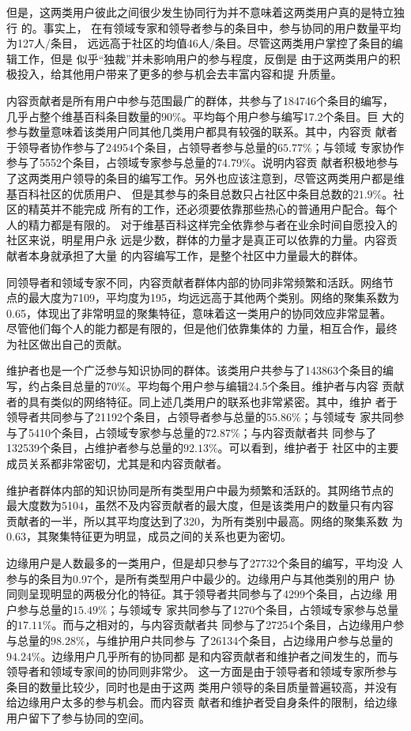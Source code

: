 但是，这两类用户彼此之间很少发生协同行为并不意味着这两类用户真的是特立独行
的。事实上，
在有领域专家和领导者参与的条目中，参与协同的用户数量平均为127人/条目，
远远高于社区的均值46人/条目。尽管这两类用户掌控了条目的编辑工作，但是
似乎“独裁”并未影响用户的参与程度，反倒是
由于这两类用户的积极投入，给其他用户带来了更多的参与机会去丰富内容和提
升质量。

内容贡献者是所有用户中参与范围最广的群体，共参与了184746个条目的编写，
几乎占整个维基百科条目数量的$90\%$。平均每个用户参与编写17.2个条目。巨
大的参与数量意味着该类用户同其他几类用户都具有较强的联系。其中，内容贡
献者于领导者协作参与了24954个条目，占领导者参与总量的$65.77\%$；与领域
专家协作参与了5552个条目，占领域专家参与总量的$74.79\%$。说明内容贡
献者积极地参与了这两类用户领导的条目的编写工作。另外也应该注意到，尽管这两类用户都是维基百科社区的优质用户、
但是其参与的条目总数只占社区中条目总数的$21.9\%$。社区的精英并不能完成
所有的工作，还必须要依靠那些热心的普通用户配合。每个人的精力都是有限的。
对于维基百科这样完全依靠参与者在业余时间自愿投入的社区来说，明星用户永
远是少数，群体的力量才是真正可以依靠的力量。内容贡献者本身就承担了大量
的内容编写工作，是整个社区中力量最大的群体。

同领导者和领域专家不同，内容贡献者群体内部的协同非常频繁和活跃。网络节
点的最大度为7109，平均度为195，均远远高于其他两个类别。网络的聚集系数为
0.65，体现出了非常明显的聚集特征，意味着这一类用户的协同效应非常显著。
尽管他们每个人的能力都是有限的，但是他们依靠集体的
力量，相互合作，最终为社区做出自己的贡献。

维护者也是一个广泛参与知识协同的群体。该类用户共参与了143863个条目的编
写，约占条目总量的$70\%$。平均每个用户参与编辑24.5个条目。维护者与内容
贡献者的具有类似的网络特征。同上述几类用户的联系也非常紧密。其中，维护
者于领导者共同参与了21192个条目，占领导者参与总量的$55.86\%$；与领域专
家共同参与了5410个条目，占领域专家参与总量的$72.87\%$；与内容贡献者共
同参与了132539个条目，占维护者参与总量的$92.13\%$。可以看到，维护者于
社区中的主要成员关系都非常密切，尤其是和内容贡献者。

维护者群体内部的知识协同是所有类型用户中最为频繁和活跃的。其网络节点的
最大度数为5104，虽然不及内容贡献者的最大度，但是该类用户的数量只有内容
贡献者的一半，所以其平均度达到了320，为所有类别中最高。网络的聚集系数
为0.63，其聚集特征更为明显，成员之间的关系也更为密切。

边缘用户是人数最多的一类用户，但是却只参与了27732个条目的编写，平均没
人参与的条目为0.97个，是所有类型用户中最少的。边缘用户与其他类别的用户
协同则呈现明显的两极分化的特征。其于领导者共同参与了4299个条目，占边缘
用户参与总量的$15.49\%$；与领域专
家共同参与了1270个条目，占领域专家参与总量的$17.11\%$。而与之相对的，与内容贡献者共
同参与了27254个条目，占边缘用户参与总量的$98.28\%$，与维护用户共同参与
了26134个条目，占边缘用户参与总量的$94.24\%$。边缘用户几乎所有的协同都
是和内容贡献者和维护者之间发生的，而与领导者和领域专家间的协同则非常少。
这一方面是由于领导者和领域专家所参与条目的数量比较少，同时也是由于这两
类用户领导的条目质量普遍较高，并没有给边缘用户太多的参与机会。而内容贡
献者和维护者受自身条件的限制，给边缘用户留下了参与协同的空间。

